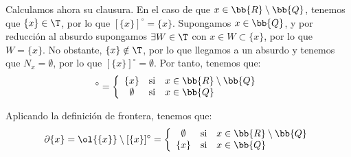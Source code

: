 \begin{ejercicio}
\begin{enumerate}[label=\alph*)]
        Calculamos ahora su clausura. En el caso de que $x\in \bb{R}\setminus \bb{Q}$, tenemos que $\{x\}\in \T$, por lo que $[\{x\}]^\circ=\{x\}$. Supongamos $x\in \bb{Q}$, y por reducción al absurdo supongamos $\exists W\in \T$ con $x\in W\subset \{x\}$, por lo que $W=\{x\}$. No obstante, $\{x\}\notin \T$, por lo que llegamos a un absurdo y tenemos que $N_x=\emptyset$, por lo que $[\{x\}]^\circ=\emptyset$. Por tanto, tenemos que:
        \begin{equation*}
            [\{x\}]^\circ = \left\{\begin{array}{ccl}
                \{x\} & \text{si} & x\in \bb{R}\setminus \bb{Q}\\
                \emptyset & \text{si} & x\in \bb{Q}
            \end{array}\right.
        \end{equation*}

        Aplicando la definición de frontera, tenemos que:
        \begin{equation*}
            \partial \{x\} = \ol{\{x\}}\setminus [\{x\}]^\circ = \left\{\begin{array}{ccl}
                \emptyset & \text{si} & x\in \bb{R}\setminus \bb{Q}\\
                \{x\} & \text{si} & x\in \bb{Q}
            \end{array}\right.
        \end{equation*}
    \end{enumerate}
\end{ejercicio}



